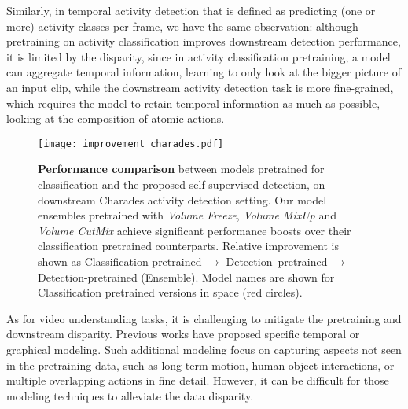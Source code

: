 \documentclass[10pt,twocolumn,letterpaper]{article}
\begin{document}
Similarly, in temporal activity detection that is defined as predicting (one or more) activity classes per frame, we have the same observation: although pretraining on activity classification improves downstream detection performance, it is limited by the disparity, since in activity classification pretraining, a model can aggregate temporal information, learning to only look at the bigger picture of an input clip, while the downstream activity detection task is more fine-grained, which requires the model to retain temporal information as much as possible, looking at the composition of atomic actions.  



\begin{figure}[t]
	\centering
	\texttt{[image: improvement\_charades.pdf]}
	\vspace{-3mm}
	\caption{\textbf{Performance comparison} between models pretrained for classification and the proposed self-supervised detection, on downstream Charades \cite{sigurdsson2016hollywood} activity detection setting. Our model ensembles pretrained with \textit{Volume Freeze}, \textit{Volume MixUp} and \textit{Volume CutMix} achieve significant performance boosts over their classification pretrained counterparts. Relative improvement is shown as Classification-pretrained $\rightarrow$ Detection--pretrained $\rightarrow$ Detection-pretrained (Ensemble). Model names are shown for Classification pretrained versions in space (red circles).}
	\label{fig:improvement}
	\vspace{-4mm}
\end{figure}

As for video understanding tasks, it is challenging to mitigate the pretraining and downstream disparity. Previous works have proposed specific temporal \cite{piergiovanni2018learning, piergiovanni2019temporal, kahatapitiya2021coarse} or graphical \cite{ghosh2020stacked, mavroudi2020representation} modeling. Such additional modeling focus on capturing aspects not seen in the pretraining data, such as long-term motion, human-object interactions, or multiple overlapping actions in fine detail. However, it can be difficult for those modeling techniques to alleviate the data disparity. 
\end{document}
